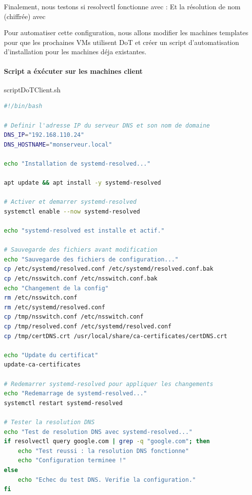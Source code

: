 \documentclass{article}
\begin{document}
Finalement, nous testons si resolvectl fonctionne avec :
Et la résolution de nom (chiffrée) avec 

Pour automatiser cette configuration, nous allons modifier les machines templates pour que les prochaines VMs utilisent DoT et créer un script d'automatisation d'installation pour les machines déja existantes.

\paragraph{Script a éxécuter sur les machines client\\}
\begin{codebox}{scriptDoTClient.sh}
\begin{lstlisting}[language=Bash]
#!/bin/bash

# Definir l'adresse IP du serveur DNS et son nom de domaine
DNS_IP="192.168.110.24"
DNS_HOSTNAME="monserveur.local"

echo "Installation de systemd-resolved..."

apt update && apt install -y systemd-resolved

# Activer et demarrer systemd-resolved
systemctl enable --now systemd-resolved

echo "systemd-resolved est installe et actif."

# Sauvegarde des fichiers avant modification
echo "Sauvegarde des fichiers de configuration..."
cp /etc/systemd/resolved.conf /etc/systemd/resolved.conf.bak
cp /etc/nsswitch.conf /etc/nsswitch.conf.bak
echo "Changement de la config"
rm /etc/nsswitch.conf
rm /etc/systemd/resolved.conf
cp /tmp/nsswitch.conf /etc/nsswitch.conf
cp /tmp/resolved.conf /etc/systemd/resolved.conf
cp /tmp/certDNS.crt /usr/local/share/ca-certificates/certDNS.crt

echo "Update du certificat"
update-ca-certificates

# Redemarrer systemd-resolved pour appliquer les changements
echo "Redemarrage de systemd-resolved..."
systemctl restart systemd-resolved

# Tester la resolution DNS
echo "Test de resolution DNS avec systemd-resolved..."
if resolvectl query google.com | grep -q "google.com"; then
    echo "Test reussi : la resolution DNS fonctionne"
    echo "Configuration terminee !"
else
    echo "Echec du test DNS. Verifie la configuration."
fi
\end{lstlisting}
\end{codebox}
\end{document}
